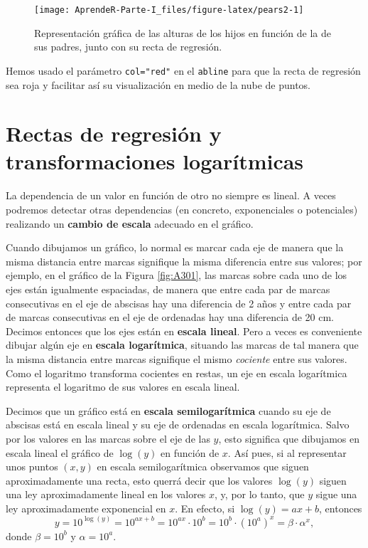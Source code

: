 \documentclass[]{book}
\theoremstyle{definition}
\theoremstyle{definition}
\theoremstyle{definition}
\theoremstyle{remark}
\begin{document}
\begin{figure}

{\centering \texttt{[image: AprendeR-Parte-I\_files/figure-latex/pears2-1]} 

}

\caption{Representación gráfica de las alturas de los hijos en función de la de sus padres, junto con su recta de regresión.}\label{fig:pears2}
\end{figure}

Hemos usado el parámetro \texttt{col="red"} en el \texttt{abline} para que la recta de regresión sea roja y facilitar así su visualización en medio de la nube de puntos.

\hypertarget{rectas-de-regresion-y-transformaciones-logaritmicas}{%
\section{Rectas de regresión y transformaciones logarítmicas}\label{rectas-de-regresion-y-transformaciones-logaritmicas}}

La dependencia de un valor en función de otro no siempre es lineal. A veces podremos detectar otras dependencias (en concreto, exponenciales o potenciales) realizando un \textbf{cambio de escala} adecuado en el gráfico.

Cuando dibujamos un gráfico, lo normal es marcar cada eje de manera que la misma distancia entre marcas signifique la misma diferencia entre sus valores; por ejemplo, en el gráfico de la Figura \ref{fig:A301}, las marcas sobre cada uno de los ejes están igualmente espaciadas, de manera que entre cada par de marcas consecutivas en el eje de abscisas hay una diferencia de 2 años y entre cada par de marcas consecutivas en el eje de ordenadas hay una diferencia de 20 cm.
Decimos entonces que los ejes están
en \textbf{escala lineal}.
Pero a veces es conveniente dibujar algún eje en \textbf{escala logarítmica}, situando las marcas de tal manera que la misma distancia entre marcas signifique el mismo \emph{cociente} entre sus valores. Como el logaritmo transforma cocientes en restas, un eje en escala logarítmica representa el logaritmo de sus valores en escala lineal.

Decimos que un gráfico está en \textbf{escala semilogarítmica} cuando su eje de abscisas está en escala lineal y su eje de ordenadas en escala logarítmica. Salvo por los valores en las marcas sobre el eje de las \(y\), esto significa que dibujamos en escala lineal el gráfico de \(\log(y)\) en función de \(x\). Así pues, si al representar unos puntos \((x,y)\) en escala semilogarítmica observamos que siguen aproximadamente una recta, esto querrá decir que los valores \(\log(y)\) siguen una ley aproximadamente lineal en los valores \(x\), y, por lo tanto, que \(y\) sigue una ley aproximadamente exponencial en \(x\). En efecto, si \(\log(y)= ax+b\), entonces
\[
y=10^{\log(y)}= 10^{ax+b}=10^{ax}\cdot 10^{b}=10^{b}\cdot (10^{a})^{x}=\beta\cdot \alpha^x,
\]
donde \(\beta=10^b\) y \(\alpha=10^a\).
\end{document}
